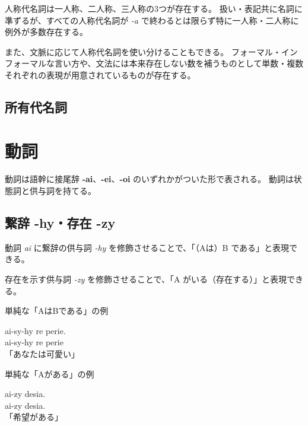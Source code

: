人称代名詞は一人称、二人称、三人称の3つが存在する。
扱い・表記共に名詞に準ずるが、すべての人称代名詞が \emph{-a} で終わるとは限らず特に一人称・二人称に例外が多数存在する。

また、文脈に応じて人称代名詞を使い分けることもできる。
フォーマル・インフォーマルな言い方や、文法には本来存在しない数を補うものとして単数・複数それぞれの表現が用意されているものが存在する。

\subsection{所有代名詞}

\section{動詞}

動詞は語幹に接尾辞 \textbf{-ai}、\textbf{-ei}、\textbf{-oi} のいずれかがついた形で表される。
動詞は状態詞と供与詞を持てる。

\subsection{繋辞 -hy・存在 -zy}

動詞 \emph{ai} に繋辞の供与詞 \emph{-hy} を修飾させることで、「（Aは）B である」と表現できる。

存在を示す供与詞 \emph{-zy} を修飾させることで、「A がいる（存在する）」と表現できる。

\begin{itembox}[l]{単純な「AはBである」の例}
    \begin{pindent}
        \noindent
        ai-sy-hy re perie. \\
        ai-sy-hy
            re perie \\
        「あなたは可愛い」
    \end{pindent}
\end{itembox}

\begin{itembox}[l]{単純な「Aがある」の例}
    \begin{pindent}
        \noindent
        ai-zy desia. \\
        ai-zy desia.\\
        「希望がある」
    \end{pindent}
\end{itembox}

